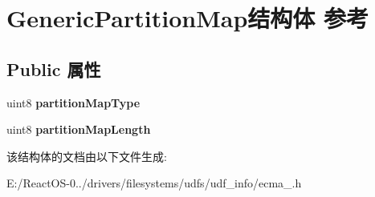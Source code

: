 \hypertarget{struct_generic_partition_map}{}\section{Generic\+Partition\+Map结构体 参考}
\label{struct_generic_partition_map}
\subsection*{Public 属性}
\begin{DoxyCompactItemize}
\item 
\mbox{\label{struct_generic_partition_map_a13159674e34adee068075c65da9a98ee}} 
uint8 {\bfseries partition\+Map\+Type}
\item 
\mbox{\label{struct_generic_partition_map_a6ebeabc8de9f667facc69e63050c1778}} 
uint8 {\bfseries partition\+Map\+Length}
\end{DoxyCompactItemize}


该结构体的文档由以下文件生成\+:\begin{DoxyCompactItemize}
\item 
E\+:/\+React\+O\+S-\/0../drivers/filesystems/udfs/udf\+\_\+info/ecma\+\_.\+h\end{DoxyCompactItemize}
